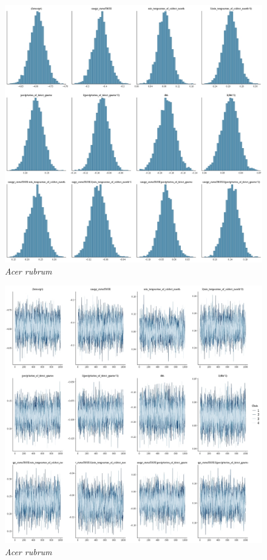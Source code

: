 \documentclass[letterpaper, 12pt]{article}
\begin{document}
\begin{figure}
	\centering
	\includegraphics[scale=0.4]{./28728-ACE-RUB_hist}
	\caption{\textit{Acer rubrum}}
\end{figure}

\begin{figure}
	\centering
	\includegraphics[scale=0.4]{./28728-ACE-RUB_traces}
	\caption{\textit{Acer rubrum}}
\end{figure}
\end{document}
